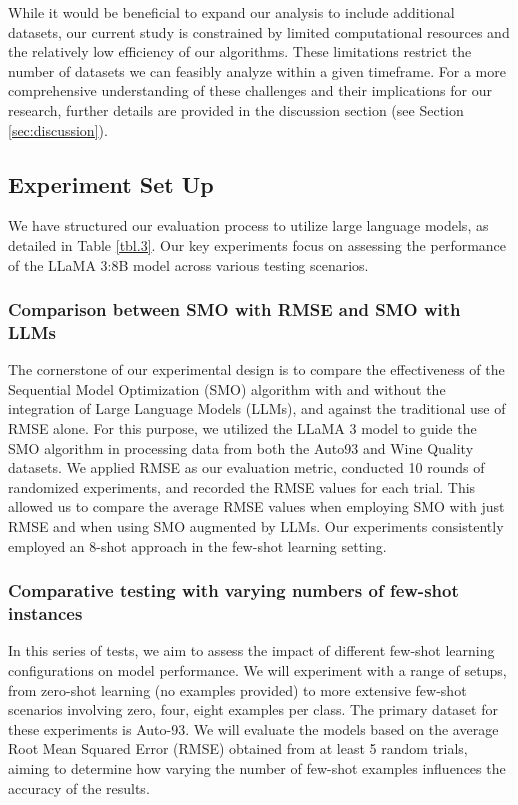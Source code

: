 \documentclass{ieeeaccess}
\begin{document}
        While it would be beneficial to expand our analysis to include additional datasets, our current study is constrained by limited computational resources and the relatively low efficiency of our algorithms. These limitations restrict the number of datasets we can feasibly analyze within a given timeframe. For a more comprehensive understanding of these challenges and their implications for our research, further details are provided in the discussion section (see Section \ref{sec:discussion}).

        \subsection{Experiment Set Up}

        We have structured our evaluation process to utilize large language models, as detailed in Table \ref{tbl.3}. Our key experiments focus on assessing the performance of the LLaMA 3:8B model across various testing scenarios.
        
        \subsubsection{Comparison between SMO with RMSE and SMO with LLMs}
        
        The cornerstone of our experimental design is to compare the effectiveness of the Sequential Model Optimization (SMO) algorithm with and without the integration of Large Language Models (LLMs), and against the traditional use of RMSE alone. For this purpose, we utilized the LLaMA 3 model to guide the SMO algorithm in processing data from both the Auto93 and Wine Quality datasets. We applied RMSE as our evaluation metric, conducted 10 rounds of randomized experiments, and recorded the RMSE values for each trial. This allowed us to compare the average RMSE values when employing SMO with just RMSE and when using SMO augmented by LLMs. Our experiments consistently employed an 8-shot approach in the few-shot learning setting.
        
        \subsubsection{Comparative testing with varying numbers of few-shot instances}
        
        In this series of tests, we aim to assess the impact of different few-shot learning configurations on model performance. We will experiment with a range of setups, from zero-shot learning (no examples provided) to more extensive few-shot scenarios involving zero, four, eight examples per class. The primary dataset for these experiments is Auto-93. We will evaluate the models based on the average Root Mean Squared Error (RMSE) obtained from at least 5 random trials, aiming to determine how varying the number of few-shot examples influences the accuracy of the results.
        
\end{document}
